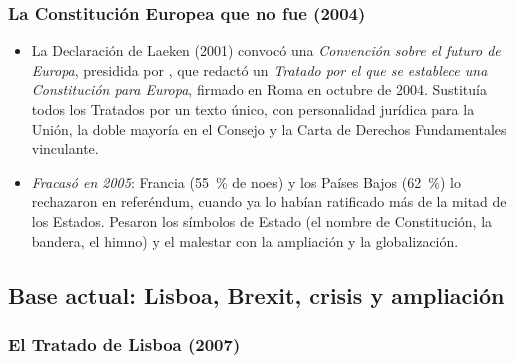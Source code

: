 \documentclass[11pt]{article}
\begin{document}
\subsubsection{La Constitución Europea que no fue (2004)}\label{sec:constitucion}

\begin{itemize}
\item La Declaración de Laeken (2001) convocó una \emph{Convención sobre el futuro de Europa}, presidida por , que redactó un \emph{Tratado por el que se establece una Constitución para Europa}, firmado en Roma en octubre de 2004. Sustituía todos los Tratados por un texto único, con personalidad jurídica para la Unión, la doble mayoría en el Consejo y la Carta de Derechos Fundamentales vinculante.
\item \emph{Fracasó en 2005}: Francia (55~\% de noes) y los Países Bajos (62~\%) lo rechazaron en referéndum, cuando ya lo habían ratificado más de la mitad de los Estados. Pesaron los símbolos de Estado (el nombre de Constitución, la bandera, el himno) y el malestar con la ampliación y la globalización.
\end{itemize}

\subsection{Base actual: Lisboa, Brexit, crisis y ampliación}\label{sec:actual}

\subsubsection{El Tratado de Lisboa (2007)}\label{sec:lisboa}
\end{document}
